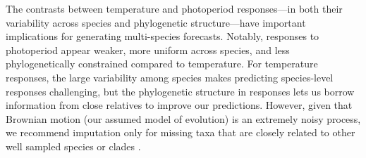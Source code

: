 \documentclass[11pt]{article}
\begin{document}

The contrasts between temperature and photoperiod responses---in both their variability across species and phylogenetic structure---have important implications for generating multi-species forecasts. Notably, responses to photoperiod appear weaker, more uniform across species, and less phylogenetically constrained compared to temperature. For temperature responses, the large variability among species makes predicting species-level  responses challenging, but the phylogenetic structure in responses lets us borrow information from close relatives to improve our predictions. However, given that Brownian motion (our assumed model of evolution) is an extremely noisy process, we recommend imputation only for missing taxa that are closely related to other well sampled species or clades \citep{molina2018assessing,molina2023unreliable}.

\end{document}
